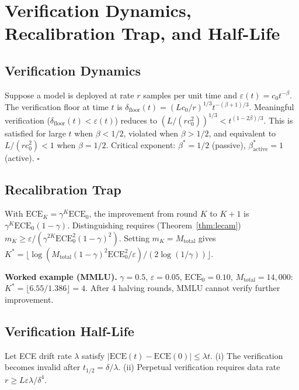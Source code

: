 \documentclass{article}
\newcommand{\ECE}{\mathrm{ECE}}
\newcommand{\Lip}{L}
\newcommand{\errrate}{\varepsilon}
\newcommand{\nsamples}{m}
\newcommand{\targetacc}{\delta}
\newcommand{\totaldata}{M_{\mathrm{total}}}
\newcommand{\deployrate}{r}
\newcommand{\verfloor}{\delta_{\mathrm{floor}}}
\newcommand{\critexp}{\beta}
\newcommand{\maxround}{K^*}
\newcommand{\shrinkfactor}{\gamma}
\newcommand{\halflife}{t_{1/2}}
\newcommand{\driftrate}{\lambda}
\newcommand{\datrate}{r}
\theoremstyle{definition}
\begin{document}
\section{Verification Dynamics, Recalibration Trap, and Half-Life}
\label{app:dynamics}

\subsection{Verification Dynamics}
Suppose a model is deployed at rate $\deployrate$ samples per unit time and $\errrate(t) = c_0 t^{-\critexp}$. The verification floor at time $t$ is $\verfloor(t) = (\Lip c_0/\deployrate)^{1/3} t^{-(\critexp+1)/3}$. Meaningful verification ($\verfloor(t) < \errrate(t)$) reduces to $(\Lip/(\deployrate c_0^2))^{1/3} < t^{(1-2\critexp)/3}$. This is satisfied for large $t$ when $\critexp < 1/2$, violated when $\critexp > 1/2$, and equivalent to $\Lip/(\deployrate c_0^2) < 1$ when $\critexp = 1/2$. Critical exponent: $\critexp^* = 1/2$ (passive), $\critexp^*_{\mathrm{active}} = 1$ (active). $\square$

\subsection{Recalibration Trap}
\label{prop:recaltrap}
With $\ECE_K = \shrinkfactor^K \ECE_0$, the improvement from round $K$ to $K+1$ is $\shrinkfactor^K \ECE_0(1-\shrinkfactor)$. Distinguishing requires (Theorem~\ref{thm:lecam}) $\nsamples_K \geq \errrate/(\shrinkfactor^{2K}\ECE_0^2(1-\shrinkfactor)^2)$. Setting $\nsamples_K = \totaldata$ gives $\maxround = \lfloor\log(\totaldata(1-\shrinkfactor)^2\ECE_0^2/\errrate)/(2\log(1/\shrinkfactor))\rfloor$.

\textbf{Worked example (MMLU).} $\shrinkfactor = 0.5$, $\errrate = 0.05$, $\ECE_0 = 0.10$, $\totaldata = 14{,}000$: $\maxround = \lfloor 6.55/1.386 \rfloor = 4$. After 4 halving rounds, MMLU cannot verify further improvement.

\subsection{Verification Half-Life}
\label{thm:halflife}
Let ECE drift rate $\driftrate$ satisfy $|\ECE(t) - \ECE(0)| \leq \driftrate t$. (i) The verification becomes invalid after $\halflife = \targetacc/\driftrate$. (ii) Perpetual verification requires data rate $\datrate \geq \Lip\errrate\driftrate/\targetacc^4$.
\end{document}
